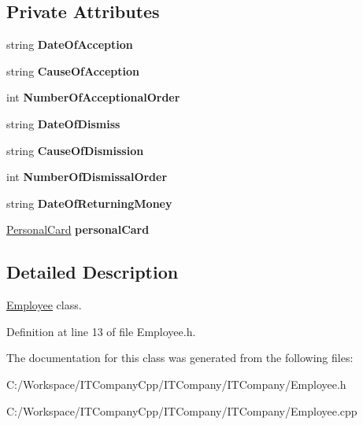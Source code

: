 \subsection*{Private Attributes}
\begin{DoxyCompactItemize}
\item 
\mbox{\label{class_employee_a4b6f93cebcc5e3bb343f89d65467c4d2}} 
string {\bfseries Date\+Of\+Acception}
\item 
\mbox{\label{class_employee_ae218a1ea5ff298c3501afa8e815da9d7}} 
string {\bfseries Cause\+Of\+Acception}
\item 
\mbox{\label{class_employee_aafefc3b0042fe3cf88dff13a6458e5de}} 
int {\bfseries Number\+Of\+Acceptional\+Order}
\item 
\mbox{\label{class_employee_a1402b4d32163d3fca601082052d2ff80}} 
string {\bfseries Date\+Of\+Dismiss}
\item 
\mbox{\label{class_employee_a80bd5a84291a0369521af1dcfecca970}} 
string {\bfseries Cause\+Of\+Dismission}
\item 
\mbox{\label{class_employee_a0dc06d409299d253f240ceb01d1a3faf}} 
int {\bfseries Number\+Of\+Dismissal\+Order}
\item 
\mbox{\label{class_employee_a05233437fad4de82175600c04552f0ca}} 
string {\bfseries Date\+Of\+Returning\+Money}
\item 
\mbox{\label{class_employee_a3a0668e43e943ba0ac0ad0470de8599a}} 
\hyperlink{class_personal_card}{Personal\+Card} {\bfseries personal\+Card}
\end{DoxyCompactItemize}


\subsection{Detailed Description}
\hyperlink{class_employee}{Employee} class. 

Definition at line 13 of file Employee.\+h.



The documentation for this class was generated from the following files\+:\begin{DoxyCompactItemize}
\item 
C\+:/\+Workspace/\+I\+T\+Company\+Cpp/\+I\+T\+Company/\+I\+T\+Company/Employee.\+h\item 
C\+:/\+Workspace/\+I\+T\+Company\+Cpp/\+I\+T\+Company/\+I\+T\+Company/Employee.\+cpp\end{DoxyCompactItemize}
